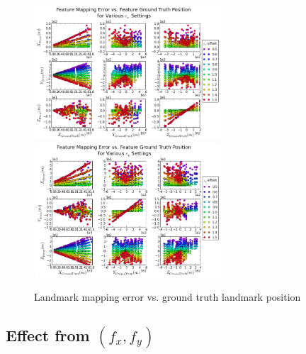 \begin{figure}[h]
  \centering
  \includegraphics[width=7cm, height=5cm]{./Figures/SimulationFigures/Figure32.png}
  \includegraphics[width=7cm, height=5cm]{./Figures/SimulationFigures/Figure33.png}
  \caption{Landmark mapping error vs. ground truth landmark position}
  \label{fig:simfig32-33}
\end{figure}
\FloatBarrier

\subsection{Effect from $(f_x, f_y)$}

